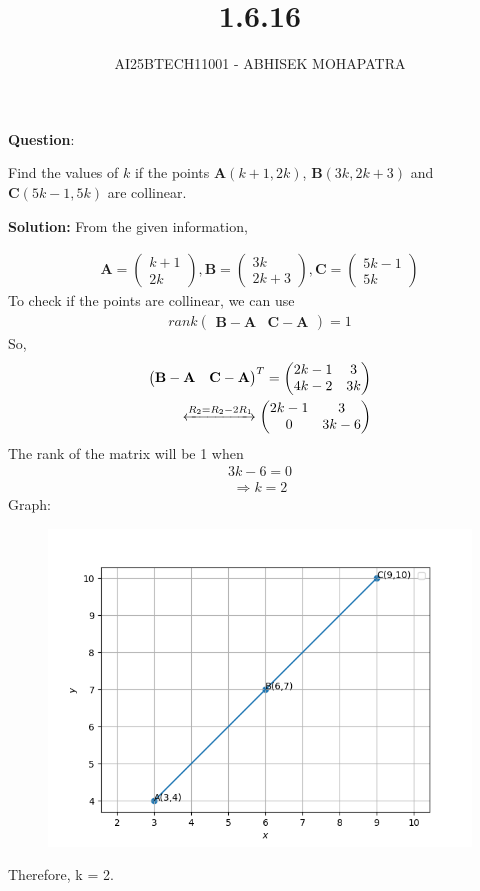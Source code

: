 \documentclass{beamer}
\title{1.6.16}
\author{AI25BTECH11001 - ABHISEK MOHAPATRA}
\theoremstyle{remark}
\newcommand{\myvec}[1]{\ensuremath{\begin{pmatrix}#1\end{pmatrix}}}
\let\vec\mathbf
\numberwithin{equation}{section}
\begin{document}
\maketitle

		\textbf{Question}:

		\noindent Find the values of $k$ if the points $\vec{A}(k +1,2k)$, $\vec{B}(3k, 2k +3)$ and $\vec{C}(5k-1,5k)$ are collinear.

		\textbf{Solution:} From the given information,


		\begin{align}
			\vec{A} = \myvec{k+1\\2k},\vec{B} = \myvec{3k\\2k+3},\vec{C} = \myvec{5k-1\\5k} 
		\end{align}
		To check if the points are collinear, we can use 
		\begin{align}
			rank\myvec{\vec{B}-\vec{A} & \vec{C}-\vec{A}} = 1	
		\end{align}
		So,
		\begin{align}
			\myvec{\vec{B}-\vec{A} & \vec{C}-\vec{A}}^T = \myvec{2k-1 & 3 \\ 4k-2 & 3k}	
			\\
			\xleftrightarrow[]{R_2 = R_2 - 2R_1} 
			\myvec{2k-1 & 3 \\ 0 & 3k-6} 
		\end{align}
		The rank of the matrix will be 1 when 
		\begin{align}
		3k-6 = 0
		\end{align}
		\begin{align}
		\Rightarrow k = 2
		\end{align}
		Graph:
\begin{figure}[H]
	\centering
	\includegraphics[scale=0.5]{img}
	\caption*{}
	\label{img}
\end{figure}


		Therefore, k = 2.
\end{document}
